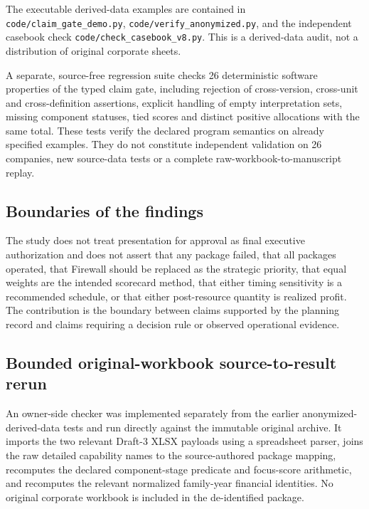 The executable derived-data examples are contained in \texttt{code/claim\_gate\_demo.py}, \texttt{code/verify\_anonymized.py}, and the independent casebook check \texttt{code/check\_casebook\_v8.py}. This is a derived-data audit, not a distribution of original corporate sheets.

A separate, source-free regression suite checks 26 deterministic software properties of the typed claim gate, including rejection of cross-version, cross-unit and cross-definition assertions, explicit handling of empty interpretation sets, missing component statuses, tied scores and distinct positive allocations with the same total. These tests verify the declared program semantics on already specified examples. They do not constitute independent validation on 26 companies, new source-data tests or a complete raw-workbook-to-manuscript replay.


\subsection{Boundaries of the findings}\label{app:boundaries}
The study does not treat presentation for approval as final executive authorization and does not assert that any package failed, that all packages operated, that Firewall should be replaced as the strategic priority, that equal weights are the intended scorecard method, that either timing sensitivity is a recommended schedule, or that either post-resource quantity is realized profit. The contribution is the boundary between claims supported by the planning record and claims requiring a decision rule or observed operational evidence.


\subsection{Bounded original-workbook source-to-result rerun}\label{app:original-rerun}
An owner-side checker was implemented separately from the earlier anonymized-derived-data tests and run directly against the immutable original archive. It imports the two relevant Draft-3 XLSX payloads using a spreadsheet parser, joins the raw detailed capability names to the source-authored package mapping, recomputes the declared component-stage predicate and focus-score arithmetic, and recomputes the relevant normalized family-year financial identities. No original corporate workbook is included in the de-identified package.

